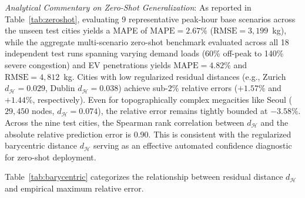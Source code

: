 \documentclass[journal]{IEEEtran}
\begin{document}
\textit{Analytical Commentary on Zero-Shot Generalization}:
As reported in Table~\ref{tab:zeroshot}, evaluating 9 representative peak-hour base scenarios across the unseen test cities yields a MAPE of $\text{MAPE} = 2.67\%$ ($\text{RMSE} = 3,199$~kg), while the aggregate multi-scenario zero-shot benchmark evaluated across all 18 independent test runs spanning varying demand loads (60\% off-peak to 140\% severe congestion) and EV penetrations yields $\text{MAPE} = 4.82\%$ and $\text{RMSE} = 4,812$~kg. Cities with low regularized residual distances (e.g., Zurich $d_{\mathcal{H}} = 0.029$, Dublin $d_{\mathcal{H}} = 0.038$) achieve sub-$2\%$ relative errors ($+1.57\%$ and $+1.44\%$, respectively). Even for topographically complex megacities like Seoul ($29,450$ nodes, $d_{\mathcal{H}} = 0.074$), the relative error remains tightly bounded at $-3.58\%$. Across the nine test cities, the Spearman rank correlation between $d_{\mathcal{H}}$ and the absolute relative prediction error is 0.90. This is consistent with the regularized barycentric distance $d_{\mathcal{H}}$ serving as an effective automated confidence diagnostic for zero-shot deployment.

Table~\ref{tab:barycentric} categorizes the relationship between residual distance $d_{\mathcal{H}}$ and empirical maximum relative error.

\begin{table}[htbp]
\caption{Regularized Barycentric Reconstruction Residual vs. Prediction Error Range (Descriptive thresholds derived from 9 test cities, not independently validated)}
\label{tab:barycentric}
\centering
{}
\end{table}
\end{document}
